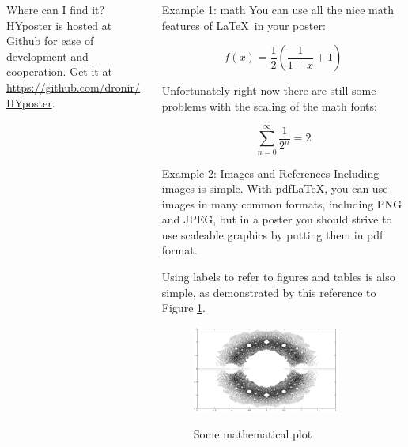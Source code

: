 \documentclass[final]{beamer}
\begin{document}
\begin{frame}[t, fragile]
\begin{columns}[T]
\begin{column}{0.32\linewidth}
\begin{block}{Where can I find it?}
HYposter is hosted at Github for ease of development and cooperation. Get it at \url{https://github.com/dronir/HYposter}.
\end{block}



\end{column}

\begin{column}{0.32\linewidth}

\begin{block}{Example 1: math}
	You can use all the nice math features of \LaTeX~in your poster:

	\begin{equation}
		f(x) = \frac{1}{2}\left(\frac{1}{1+x} + 1\right)
	\end{equation}	

	Unfortunately right now there are still some problems with the scaling of the math fonts:

	\begin{equation}
		\sum_{n=0}^\infty \frac{1}{2^n} = 2
	\end{equation}
	


\end{block}
	
	
\begin{block}{Example 2: Images and References}
Including images is simple.  With pdf\LaTeX, you can use images in many common formats, including PNG and JPEG, but in a poster you should strive to use scaleable graphics by putting them in pdf format.
	
Using labels to refer to figures and tables is also simple, as demonstrated by this reference to Figure \ref{examplefigure}.

\begin{figure}
\includegraphics[width=0.8\textwidth]{zeros.png}
\label{examplefigure}
\caption{Some mathematical plot}
\end{figure}


\end{block}
\end{column}
\end{columns}
\end{frame}
\end{document}

